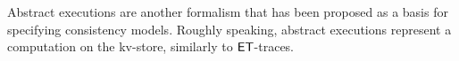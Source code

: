 


Abstract executions \cite{ev_transactions,framework-concur} are another formalism 
that has been proposed as a basis for specifying consistency models. 
Roughly speaking, abstract executions represent a computation on the kv-store, 
similarly to $\mathsf{ET}$-traces. 

%

